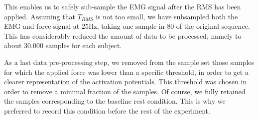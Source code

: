 
This enables us to safely sub-sample the EMG signal after the RMS has been applied. Assuming that $T_{RMS}$ is not too small, we have subsampled both the EMG and force signal at $25$Hz, taking one sample in $80$ of the original sequence. This has considerably reduced the amount of data to be processed, namely to about $30.000$ samples for each subject.

As a last data pre-processing step, we removed from the sample set those samples for which the applied force was lower than a specific threshold, in order to get a clearer representation of the activation potentials. This threshold was chosen in order to remove a minimal fraction of the samples. Of course, we fully retained the samples corresponding to the baseline rest condition. This is why we preferred to record this condition before the rest of the experiment.